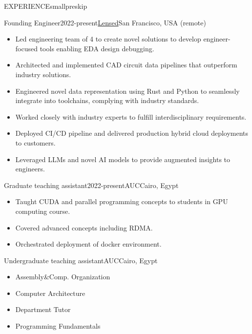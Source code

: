 \documentclass{resume}
\begin{document}
\begin{minipage}[t]{0.45\textwidth}

	\begin{rsection}{\MakeUppercase{experience}}{smallpreskip}
		\begin{rcontent}{Founding Engineer}{2022-present}{\href{https://lensed.app/}{Lensed}}{San Francisco, USA (remote)}
		\begin{itemize}
			\item Led engineering team of 4 to create novel solutions to develop engineer-focused tools enabling EDA design debugging.
			\item Architected and implemented CAD circuit data pipelines that outperform industry solutions.
			\item Engineered novel data representation using Rust and Python to seamlessly integrate into toolchains, complying with industry standards.
			\item Worked closely with industry experts to fulfill interdisciplinary requirements.
			\item Deployed CI/CD pipeline and delivered production hybrid cloud deployments to customers.
			\item Leveraged LLMs and novel AI models to provide augmented insights to engineers.
		\end{itemize}
		\end{rcontent}
		\divider
		\begin{rcontent}{Graduate teaching assistant}{2022-present}{AUC}{Cairo, Egypt}
			\begin{itemize}
				\item Taught CUDA and parallel programming concepts to students in GPU computing course.
				\item Covered advanced concepts including RDMA.
				\item Orchestrated deployment of docker environment.
			\end{itemize}
		\end{rcontent}
		\divider
		\begin{rcontent}{Undergraduate teaching assistant}{}{AUC}{Cairo, Egypt}
			\begin{itemize}
				\item Assembly\&Comp. Organization 
				\item Computer Architecture 
				\item Department Tutor 
				\item Programming Fundamentals 

\end{itemize}
\end{rcontent}
\end{rsection}
\end{minipage}
\end{document}
